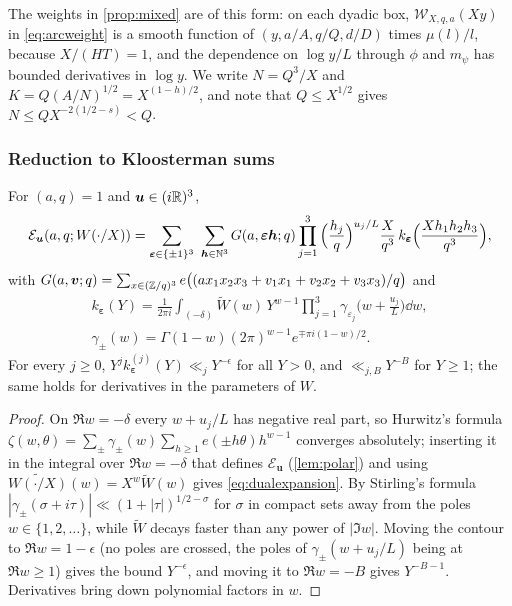 \documentclass[11pt,colorlinks]{charlie}
\begin{document}
The weights in \cref{prop:mixed} are of this form: on each dyadic box, $\mathcal W_{X,q,a}(Xy)$ in \eqref{eq:arcweight} is a smooth function of $(y,a/A,q/Q,d/D)$ times $\mu(l)/l$, because $X/(HT)=1$, and the dependence on $\log y/L$ through $\phi$ and $m_\psi$ has bounded derivatives in $\log y$. We write $N=Q^3/X$ and $K=Q(A/N)^{1/2}=X^{(1-h)/2}$, and note that $Q\le X^{1/2}$ gives $N\le Q X^{-2(1/2-s)}<Q$.

\subsubsection{Reduction to Kloosterman sums}
\begin{lemma}\label{lem:voronoi}
For $(a,q)=1$ and $\boldsymbol u\in(i\mathbb{R})^3$,
\begin{equation}\label{eq:dualexpansion}
 \mathcal E_{\boldsymbol u}(a,q;W(\cdot/X))=\sum_{\boldsymbol\varepsilon\in\{\pm1\}^3}\ \sum_{\boldsymbol h\in\N^3}G(a,\boldsymbol\varepsilon\boldsymbol h;q)\prod_{j=1}^3\Big(\frac{h_j}q\Big)^{u_j/L}\frac X{q^3}\,k_{\boldsymbol\varepsilon}\Big(\frac{Xh_1h_2h_3}{q^3}\Big),
\end{equation}
with $G(a,\boldsymbol v;q)=\sum_{x\in(\mathbb{Z}/q)^3}e\big((ax_1x_2x_3+v_1x_1+v_2x_2+v_3x_3)/q\big)$ and
\begin{gather*}
 k_{\boldsymbol\varepsilon}(Y)=\frac1{2\pi i}\int_{(-\delta)}\widetilde W(w)\,Y^{w-1}\prod_{j=1}^3\gamma_{\varepsilon_j}\Big(w+\frac{u_j}L\Big)\dd w,\\
 \gamma_\pm(w)=\Gamma(1-w)(2\pi)^{w-1}e^{\mp\pi i(1-w)/2}.
\end{gather*}
For every $j\ge0$, $Y^jk^{(j)}_{\boldsymbol\varepsilon}(Y)\ll_{j}Y^{-\epsilon}$ for all $Y>0$, and $\ll_{j,B}Y^{-B}$ for $Y\ge1$; the same holds for derivatives in the parameters of $W$.
\end{lemma}
\begin{proof}
On $\Re w=-\delta$ every $w+u_j/L$ has negative real part, so Hurwitz's formula $\zeta(w,\theta)=\sum_\pm\gamma_\pm(w)\sum_{h\ge1}e(\pm h\theta)h^{w-1}$ \cite[(12.10)]{Apostol} converges absolutely; inserting it in the integral over $\Re w=-\delta$ that defines $\mathcal E_{\boldsymbol u}$ (\cref{lem:polar}) and using $\widetilde{W(\cdot/X)}(w)=X^w\widetilde W(w)$ gives \eqref{eq:dualexpansion}. By Stirling's formula $|\gamma_\pm(\sigma+i\tau)|\ll(1+|\tau|)^{1/2-\sigma}$ for $\sigma$ in compact sets away from the poles $w\in\{1,2,\dots\}$, while $\widetilde W$ decays faster than any power of $|\Im w|$. Moving the contour to $\Re w=1-\epsilon$ (no poles are crossed, the poles of $\gamma_\pm(w+u_j/L)$ being at $\Re w\ge1$) gives the bound $Y^{-\epsilon}$, and moving it to $\Re w=-B$ gives $Y^{-B-1}$. Derivatives bring down polynomial factors in $w$.
\end{proof}
\end{document}
